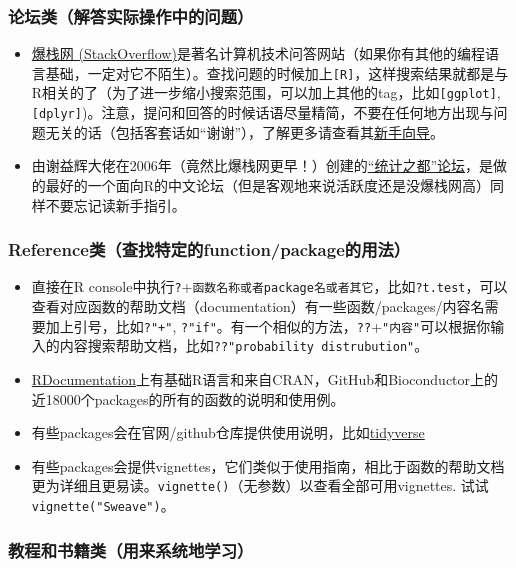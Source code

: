\documentclass[]{book}
\providecommand{\tightlist}{%
  \setlength{\itemsep}{0pt}\setlength{\parskip}{0pt}}
\begin{document}
\hypertarget{forum}{%
\subsubsection{论坛类（解答实际操作中的问题）}\label{forum}}

\begin{itemize}
\tightlist
\item
  \href{https://stackoverflow.com}{爆栈网 (StackOverflow)}是著名计算机技术问答网站（如果你有其他的编程语言基础，一定对它不陌生）。查找问题的时候加上\texttt{{[}R{]}}，这样搜索结果就都是与R相关的了（为了进一步缩小搜索范围，可以加上其他的tag，比如\texttt{{[}ggplot{]}}, \texttt{{[}dplyr{]}})。注意，提问和回答的时候话语尽量精简，不要在任何地方出现与问题无关的话（包括客套话如``谢谢''），了解更多请查看其\href{https://stackoverflow.com/tour}{新手向导}。
\item
  由谢益辉大佬在2006年（竟然比爆栈网更早！）创建的\href{https://d.cosx.org}{``统计之都''论坛}，是做的最好的一个面向R的中文论坛（但是客观地来说活跃度还是没爆栈网高）同样不要忘记读新手指引。
\end{itemize}

\hypertarget{reference}{%
\subsubsection{Reference类（查找特定的function/package的用法）}\label{reference}}

\begin{itemize}
\tightlist
\item
  直接在R console中执行\texttt{?}+\texttt{函数名称或者package名或者其它}，比如\texttt{?t.test}，可以查看对应函数的帮助文档（documentation）有一些函数/packages/内容名需要加上引号，比如\texttt{?"+"}, \texttt{?"if"}。有一个相似的方法，\texttt{??}+\texttt{"内容"}可以根据你输入的内容搜索帮助文档，比如\texttt{??"probability\ distrubution"}。
\item
  \href{https://www.rdocumentation.org}{RDocumentation}上有基础R语言和来自CRAN，GitHub和Bioconductor上的近18000个packages的所有的函数的说明和使用例。
\item
  有些packages会在官网/github仓库提供使用说明，比如\href{https://www.tidyverse.org}{tidyverse}
\item
  有些packages会提供vignettes，它们类似于使用指南，相比于函数的帮助文档更为详细且更易读。\texttt{vignette()}（无参数）以查看全部可用vignettes. 试试\texttt{vignette("Sweave")}。
\end{itemize}

\hypertarget{manual-type}{%
\subsubsection{教程和书籍类（用来系统地学习）}\label{manual-type}}
\end{document}

